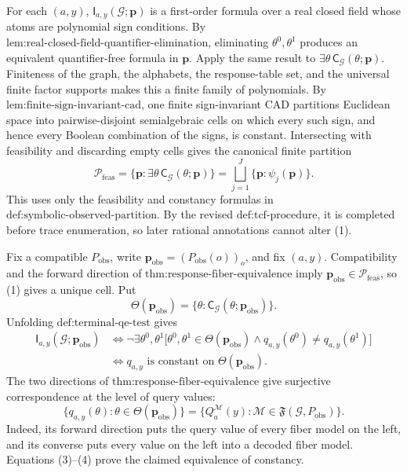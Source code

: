 For each \((a,y)\), \(\mathsf I_{a,y}(\mathcal G;\mathbf p)\) is a first-order formula over a real closed field whose atoms are polynomial sign conditions. By \(\text{lem:real-closed-field-quantifier-elimination}\), eliminating \(\theta^0,\theta^1\) produces an equivalent quantifier-free formula in \(\mathbf p\). Apply the same result to \(\exists\theta\,\mathsf C_{\mathcal G}(\theta;\mathbf p)\). Finiteness of the graph, the alphabets, the response-table set, and the universal finite factor supports makes this a finite family of polynomials. By \(\text{lem:finite-sign-invariant-cad}\), one finite sign-invariant CAD partitions Euclidean space into pairwise-disjoint semialgebraic cells on which every such sign, and hence every Boolean combination of the signs, is constant. Intersecting with feasibility and discarding empty cells gives the canonical finite partition
\[
\mathcal P_{\mathrm{feas}}
=\{\mathbf p:\exists\theta\,\mathsf C_{\mathcal G}(\theta;\mathbf p)\}
=\bigsqcup_{j=1}^J\{\mathbf p:\psi_j(\mathbf p)\}.
\tag{1}
\]
This uses only the feasibility and constancy formulas in \(\text{def:symbolic-observed-partition}\). By the revised \(\text{def:tcf-procedure}\), it is completed before trace enumeration, so later rational annotations cannot alter (1).

Fix a compatible \(P_{\mathrm{obs}}\), write \(\mathbf p_{\mathrm{obs}}=(P_{\mathrm{obs}}(o))_o\), and fix \((a,y)\). Compatibility and the forward direction of \(\text{thm:response-fiber-equivalence}\) imply \(\mathbf p_{\mathrm{obs}}\in\mathcal P_{\mathrm{feas}}\), so (1) gives a unique cell. Put
\[
\Theta(\mathbf p_{\mathrm{obs}})
=\{\theta:\mathsf C_{\mathcal G}(\theta;\mathbf p_{\mathrm{obs}})\}.
\tag{2}
\]
Unfolding \(\text{def:terminal-qe-test}\) gives
\[
\begin{aligned}
\mathsf I_{a,y}(\mathcal G;\mathbf p_{\mathrm{obs}})
&\Longleftrightarrow
\neg\exists\theta^0,\theta^1
\bigl[\theta^0,\theta^1\in\Theta(\mathbf p_{\mathrm{obs}})
\wedge q_{a,y}(\theta^0)\neq q_{a,y}(\theta^1)\bigr]\\
&\Longleftrightarrow
q_{a,y}\text{ is constant on }\Theta(\mathbf p_{\mathrm{obs}}).
\end{aligned}
\tag{3}
\]
The two directions of \(\text{thm:response-fiber-equivalence}\) give surjective correspondence at the level of query values:
\[
\{q_{a,y}(\theta):\theta\in\Theta(\mathbf p_{\mathrm{obs}})\}
=\{Q_a^{\mathcal M}(y):\mathcal M\in\mathfrak F(\mathcal G,P_{\mathrm{obs}})\}.
\tag{4}
\]
Indeed, its forward direction puts the query value of every fiber model on the left, and its converse puts every value on the left into a decoded fiber model. Equations (3)--(4) prove the claimed equivalence of constancy.


